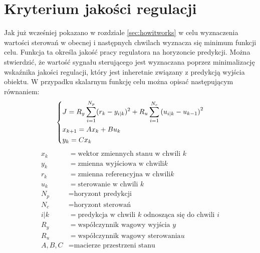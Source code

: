 \section{Kryterium jakości regulacji} \label{sec:quality}
Jak już wcześniej pokazano w rozdziale \ref{sec:howitworks} w celu wyznaczenia wartości sterowań
w obecnej i następnych chwilach wyznacza się minimum funkcji celu. Funkcja ta określa jakość pracy
regulatora na horyzoncie predykcji. Można stwierdzić, że wartość sygnału sterującego jest wyznaczana
poprzez minimalizację wskaźnika jakości regulacji, który jest inheretnie związany z predykcją wyjścia
obiektu.
\newline W przypadku skalarnym funkcję celu można opisać następującym równaniem:
\begin{equation}
    \begin{dcases}
        J=R_{y}\sum _{i=1}^{N_{p}}(r_{k}-y_{i|k})^{2}+R_{u}\sum _{i=1}^{N_{c}}{(u_{i|k}-u_{k-1})}^{2}\\
        x_{k+1}=Ax_{k}+Bu_{k}\\
        y_{k}=Cx_{k} 
    \end{dcases}
\label{eq:quality}
\end{equation}
\begin{align*}
    x_{k} &= \text{wektor zmiennych stanu w chwili }k\\
    y_{k} &= \text{zmienna wyjściowa w chwili} k\\
    r_{k} &= \text{zmienna referencyjna w chwili} k\\
    u_{k} &= \text{sterowanie w chwili }k\\
    N_{p} &= \text{horyzont predykcji}\\
    N_{c} &= \text{horyzont sterowań}\\
    i|k &= \text{predykcja w chwili }k\text{ odnosząca się do chwili }i\\
    R_{y} &= \text{współczynnik wagowy wyjścia }y\\
    R_{u} &= \text{współczynnik wagowy sterowania}u\\
    A, B, C &= \text{macierze przestrzeni stanu}
\end{align*}

